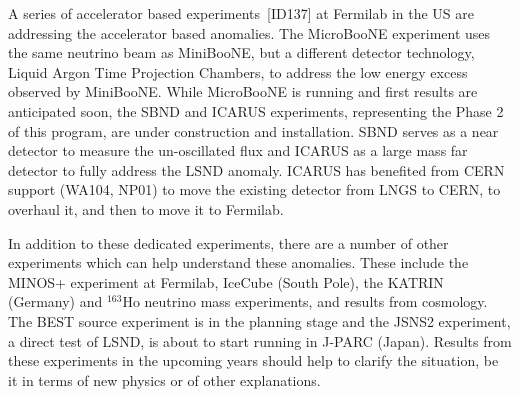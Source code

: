 A series of accelerator based experiments~[ID137] %
at Fermilab in the US are addressing the accelerator based anomalies. The MicroBooNE experiment uses the same neutrino beam as MiniBooNE, but a different detector technology, Liquid Argon Time Projection Chambers, to address the low energy excess observed by MiniBooNE.  While MicroBooNE is running and first results are anticipated soon, the SBND and ICARUS experiments, representing the Phase 2 of this program, are under construction and installation.  SBND serves as a near detector to measure the un-oscillated flux and ICARUS as a large mass far detector to fully address the LSND anomaly. ICARUS has benefited from CERN support (WA104, NP01) to move the existing detector from LNGS to CERN, to overhaul it, and then to move it to Fermilab. 

In addition to these dedicated experiments, there are a number of other experiments which can help understand these anomalies.  These include the MINOS+ experiment at Fermilab, IceCube (South Pole), the KATRIN (Germany) and $^{163}$Ho neutrino mass experiments, and results from cosmology.  The BEST source experiment is in the planning stage and the JSNS2 experiment, a direct test of LSND, is about to start running in J-PARC (Japan).  Results from these experiments in the upcoming years should help to clarify the situation, be it in terms of new physics or of other explanations.
